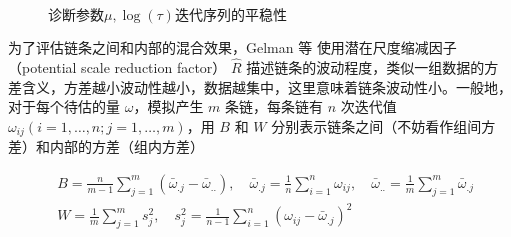 \documentclass[12pt,a4paper,UTF8,twoside]{book}
\theoremstyle{definition}
\theoremstyle{definition}
\theoremstyle{definition}
\theoremstyle{remark}
\begin{document}
\begin{figure}[!htb]

{\centering {}\\

}

\caption{诊断参数$\mu,\log(\tau)$迭代序列的平稳性}\label{fig:diagnostic}
\end{figure}

为了评估链条之间和内部的混合效果，Gelman 等 \citep{Gelman2013R}
使用潜在尺度缩减因子 （potential scale reduction factor） \(\hat{R}\)
描述链条的波动程度，类似一组数据的方差含义，方差越小波动性越小，数据越集中，这里意味着链条波动性小。一般地，对于每个待估的量
\(\omega\)，模拟产生 \(m\) 条链，每条链有 \(n\) 次迭代值
\(\omega_{ij} (i = 1,\ldots,n;j=1,\ldots,m)\)，用 \(B\) 和 \(W\)
分别表示链条之间（不妨看作组间方差）和内部的方差（组内方差）

\begin{equation}
\begin{aligned}
& B = \frac{n}{m-1}\sum_{j=1}^{m}(\bar{\omega}_{.j} - \bar{\omega}_{..} ), \quad \bar{\omega}_{.j} = \frac{1}{n}\sum_{i=1}^{n}\omega_{ij}, \quad \bar{\omega}_{..} = \frac{1}{m}\sum_{j=1}^{m} \bar{\omega}_{.j}\\
& W = \frac{1}{m}\sum_{j=1}^{m}s^{2}_{j}, \quad s^{2}_{j} = \frac{1}{n-1}\sum_{i=1}^{n}(\omega_{ij} - \bar{\omega}_{.j})^2
\end{aligned} \label{eq:potential-scale-reduction}
\end{equation}
\end{document}

